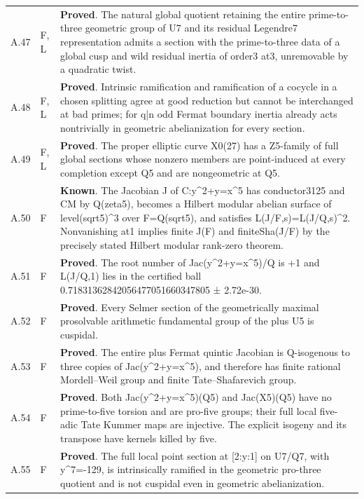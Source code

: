\begin{longtable}{@{}p{}p{}p{}@{}}
A.47 & F, L & \textbf{Proved}. The natural global quotient retaining the entire prime-to-three geometric group of U7 and its residual Legendre7 representation admits a section with the prime-to-three data of a global cusp and wild residual inertia of order3 at3, unremovable by a quadratic twist. \\
A.48 & F, L & \textbf{Proved}. Intrinsic ramification and ramification of a cocycle in a chosen splitting agree at good reduction but cannot be interchanged at bad primes; for q|n odd Fermat boundary inertia already acts nontrivially in geometric abelianization for every section. \\
A.49 & F, L & \textbf{Proved}. The proper elliptic curve X0(27) has a Z5-family of full global sections whose nonzero members are point-induced at every completion except Q5 and are nongeometric at Q5. \\
A.50 & F & \textbf{Known}. The Jacobian J of C:y\textasciicircum{}2+y=x\textasciicircum{}5 has conductor3125 and CM by Q(zeta5), becomes a Hilbert modular abelian surface of level(sqrt5)\textasciicircum{}3 over F=Q(sqrt5), and satisfies L(J/F,s)=L(J/Q,s)\textasciicircum{}2. Nonvanishing at1 implies finite J(F) and finiteSha(J/F) by the precisely stated Hilbert modular rank-zero theorem. \\
A.51 & F & \textbf{Proved}. The root number of Jac(y\textasciicircum{}2+y=x\textasciicircum{}5)/Q is +1 and L(J/Q,1) lies in the certified ball 0.71831362842056477051660347805 ± 2.72e-30. \\
A.52 & F & \textbf{Proved}. Every Selmer section of the geometrically maximal prosolvable arithmetic fundamental group of the plus U5 is cuspidal. \\
A.53 & F & \textbf{Proved}. The entire plus Fermat quintic Jacobian is Q-isogenous to three copies of Jac(y\textasciicircum{}2+y=x\textasciicircum{}5), and therefore has finite rational Mordell--Weil group and finite Tate--Shafarevich group. \\
A.54 & F & \textbf{Proved}. Both Jac(y\textasciicircum{}2+y=x\textasciicircum{}5)(Q5) and Jac(X5)(Q5) have no prime-to-five torsion and are pro-five groups; their full local five-adic Tate Kummer maps are injective. The explicit isogeny and its transpose have kernels killed by five. \\
A.55 & F & \textbf{Proved}. The full local point section at [2:y:1] on U7/Q7, with y\textasciicircum{}7=-129, is intrinsically ramified in the geometric pro-three quotient and is not cuspidal even in geometric abelianization. \\

\end{longtable}
